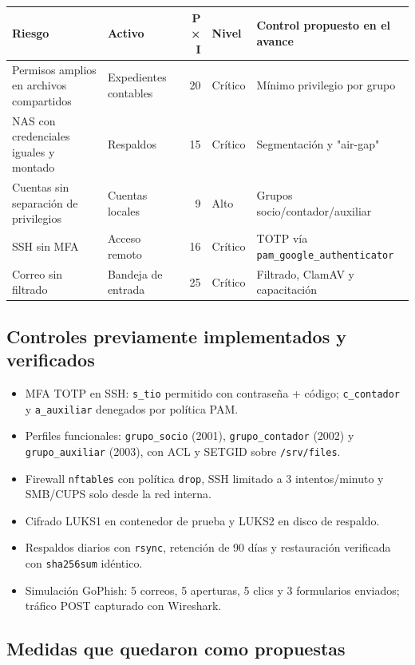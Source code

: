 \documentclass[letterpaper]{article}
\begin{document}
\begin{center}
\begin{tabular}{llrll}
Riesgo & Activo & P × I & Nivel & Control propuesto en el avance\\
\hline
Permisos amplios en archivos compartidos & Expedientes contables & 20 & Crítico & Mínimo privilegio por grupo\\
NAS con credenciales iguales y montado & Respaldos & 15 & Crítico & Segmentación y "air-gap"\\
Cuentas sin separación de privilegios & Cuentas locales & 9 & Alto & Grupos socio/contador/auxiliar\\
SSH sin MFA & Acceso remoto & 16 & Crítico & TOTP vía \texttt{pam\_google\_authenticator}\\
Correo sin filtrado & Bandeja de entrada & 25 & Crítico & Filtrado, ClamAV y capacitación\\
\end{tabular}
\end{center}
\subsection{Controles previamente implementados y verificados}
\label{sec:org632ca7e}

\begin{itemize}
\item MFA TOTP en SSH: \texttt{s\_tio} permitido con contraseña + código; \texttt{c\_contador} y
\texttt{a\_auxiliar} denegados por política PAM.
\item Perfiles funcionales: \texttt{grupo\_socio} (2001), \texttt{grupo\_contador} (2002) y
\texttt{grupo\_auxiliar} (2003), con ACL y SETGID sobre \texttt{/srv/files}.
\item Firewall \texttt{nftables} con política \texttt{drop}, SSH limitado a 3 intentos/minuto y
SMB/CUPS solo desde la red interna.
\item Cifrado LUKS1 en contenedor de prueba y LUKS2 en disco de respaldo.
\item Respaldos diarios con \texttt{rsync}, retención de 90 días y restauración verificada
con \texttt{sha256sum} idéntico.
\item Simulación GoPhish: 5 correos, 5 aperturas, 5 clics y 3 formularios enviados;
tráfico POST capturado con Wireshark.
\end{itemize}
\subsection{Medidas que quedaron como propuestas}
\label{sec:org160220d}
\end{document}
